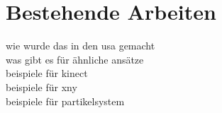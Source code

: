 \chapter{Bestehende Arbeiten}
\begin{Spacing}{\mylinespace}

wie wurde das in den usa gemacht\\
was gibt es für ähnliche ansätze\\
beispiele für kinect\\
beispiele für xny\\
beispiele für partikelsystem\\

\end{Spacing}
\newpage
\clearpage

